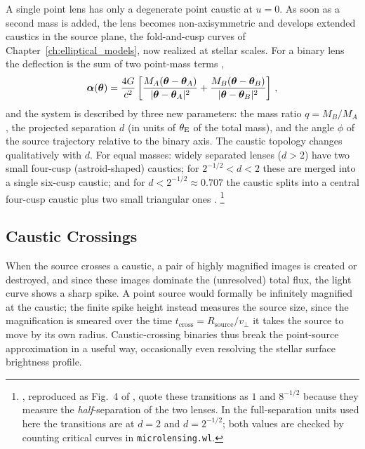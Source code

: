 A single point lens has only a degenerate point caustic at $u=0$.  As soon as
a second mass is added, the lens becomes non-axisymmetric and develops
extended caustics in the source plane, the fold-and-cusp
curves of Chapter~\ref{ch:elliptical_models}, now realized at stellar scales.
For a binary lens the deflection is the sum of two point-mass terms
\citep[eq.~14]{schneider_kochanek_wambsganss_2006},
\begin{equation}
    \boldsymbol{\alpha}(\boldsymbol{\theta}) = \frac{4G}{c^2}
    \left[
    \frac{M_A(\boldsymbol{\theta} - \boldsymbol{\theta}_A)}{|\boldsymbol{\theta} - \boldsymbol{\theta}_A|^2}
    + \frac{M_B(\boldsymbol{\theta} - \boldsymbol{\theta}_B)}{|\boldsymbol{\theta} - \boldsymbol{\theta}_B|^2}
    \right] \,,
    \label{eq:micro_binary_alpha}
\end{equation}
and the system is described by three new parameters: the mass ratio
$q = M_B/M_A$, the projected separation $d$ (in units of $\theta_{\mathrm{E}}$ of the total
mass), and the angle $\phi$ of the source trajectory relative to the binary
axis.  The caustic topology changes qualitatively with $d$.  For equal
masses: widely separated lenses ($d > 2$) have two small four-cusp
(astroid-shaped) caustics; for $2^{-1/2} < d < 2$ these are merged into a
single six-cusp caustic; and for $d < 2^{-1/2} \approx 0.707$ the caustic
splits into a central four-cusp caustic plus two small triangular ones
\citep{schneider_weiss_1986, petters_singularity_2001}
\citep[Part~4, Sect.~2.1]{schneider_kochanek_wambsganss_2006}.%
\footnote{\citet{schneider_weiss_1986}, reproduced as Fig.~4 of
\citet[Part~4]{schneider_kochanek_wambsganss_2006}, quote these transitions
as $1$ and $8^{-1/2}$ because they measure the \emph{half}-separation of the
two lenses.  In the full-separation units used here the transitions are at
$d = 2$ and $d = 2^{-1/2}$; both values are checked by counting critical
curves in \texttt{microlensing.wl}.}

\subsection{Caustic Crossings}

When the source crosses a
caustic, a pair of highly magnified images is created or destroyed, and since
these images dominate the (unresolved) total flux, the light curve shows a
sharp spike.  A point source would formally be infinitely magnified at the
caustic; the finite spike height instead measures the source size,
since the magnification is smeared over the time
$t_{\mathrm{cross}} = R_{\mathrm{source}}/v_\perp$ it takes the source to move
by its own radius.  Caustic-crossing binaries thus break the point-source
approximation in a useful way, occasionally even resolving the stellar surface
brightness profile.

